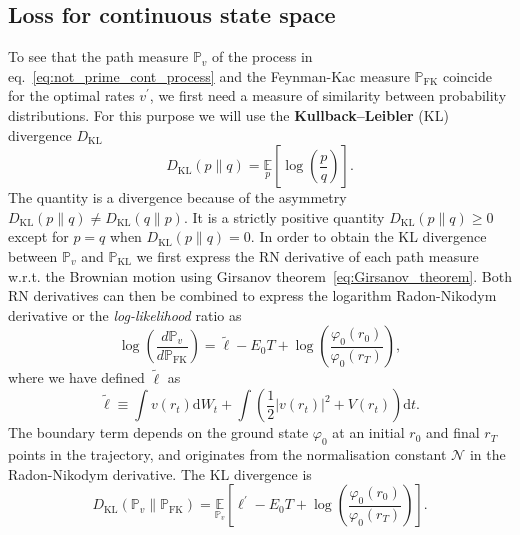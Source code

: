 \subsection{Loss for continuous state space}
\label{subsec:continuous_loss}
To see that the path measure $\mathbb{P}_v$ of the process in eq.~\eqref{eq:not_prime_cont_process}  and the Feynman-Kac measure $\mathbb{P}_{\mathrm{FK}}$ coincide for the optimal rates $v^\prime$, we first need a measure of similarity between probability distributions. For this purpose we will use the \textbf{Kullback–Leibler} (KL) divergence $D_{\mathrm{KL}}$
\begin{equation}
	D_{\mathrm{KL}}(p \| q)=\underset{p}{\mathbb{E}}\left[\log \left(\frac{p}{q}\right)\right].
\end{equation}
The quantity is a divergence because of the asymmetry $D_{\mathrm{KL}}(p \| q) \neq D_{\mathrm{KL}}(q \| p)$. It is a strictly positive quantity $D_{\mathrm{KL}}(p \| q) \geq 0$ except for $p = q$ when $D_{\mathrm{KL}}(p \| q) = 0$. In order to obtain the KL divergence between $\mathbb{P}_v$ and $\mathbb{P}_{\mathrm{KL}}$ we first express the RN derivative of each path measure w.r.t. the Brownian motion using Girsanov theorem~\eqref{eq:Girsanov_theorem}. Both RN derivatives can then be combined to express the logarithm Radon-Nikodym derivative or the \emph{log-likelihood} ratio as
\begin{equation}
\log \left(\frac{d \mathbb{P}_{v}}{d \mathbb{P}_{\mathrm{FK}}}\right)=
\tilde{\ell}-
E_{0} T+
\log 
\left(
\frac{\varphi_{0}\left(r_{0}\right)}{\varphi_{0}\left(r_{T}\right)}
\right),
\end{equation}
where we have defined $\tilde{\ell}$ as
\begin{equation}
\tilde{\ell} \equiv \int v\left(r_{t}\right) \mathrm{d} W_{t}+\int \left(\frac{1}{2}\left|v\left(r_{t}\right)\right|^{2}+V\left(r_{t}\right)\right)\mathrm{d} t.
\end{equation}
The boundary term depends on the ground state $\varphi_0$ at an initial $r_0$ and final $r_T$ points in the trajectory, and originates from the normalisation constant $\mathcal{N}$ in the Radon-Nikodym derivative. The KL divergence is 
\begin{equation}
\label{eq:ltilde-cont}
D_{\mathrm{KL}}\left(\mathbb{P}_{v} \| \mathbb{P}_{\mathrm{FK}}\right)=\underset{\mathbb{P}_{v}}{\mathbb{E}}\left[\ell^\prime-E_{0} T+\log \left(\frac{\varphi_{0}\left(r_{0}\right)}{\varphi_{0}\left(r_{T}\right)}\right)\right].
\end{equation}
